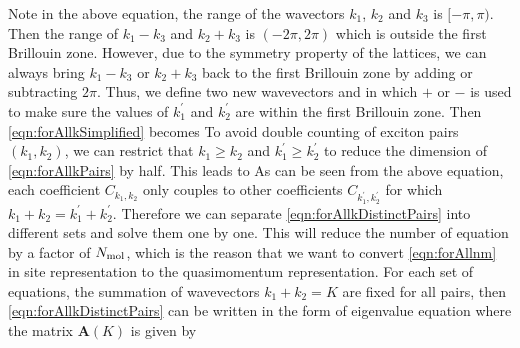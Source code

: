 Note in the above equation, the range of the wavectors $k_1$, $k_2$ and $k_3$ is $[-\pi, \pi)$. Then the range of 
$k_1 - k_3$ and $k_2 + k_3$ is $(-2\pi, 2\pi)$ which is outside the first Brillouin zone. However, due to the symmetry
 property of the lattices, we can always bring $k_1 - k_3$ or $k_2 + k_3$ back to the first Brillouin zone by adding or 
subtracting $2\pi$. Thus, we define two new wavevectors
and 
in which $+$ or $-$ is used to make sure the values of $k_1^{'}$ and $k_2^{'}$ are within the first Brillouin zone. Then 
\autoref{eqn:forAllkSimplified} becomes
To avoid double counting of exciton pairs $(k_1, k_2)$, we can restrict that $k_1 \ge k_2$ and $k_1^{'} \ge k_2^{'}$ to
 reduce the dimension of \autoref{eqn:forAllkPairs} by half. This leads to 
As can be seen from the above equation, each coefficient $C_{k_1, k_2}$ only couples to other coefficients $C_{k_1^{'},
 k_2^{'}}$ for which $k_1 + k_2 = k_1^{'} + k_2^{'} $. Therefore we can separate \autoref{eqn:forAllkDistinctPairs} into 
different sets and solve them one by one. This will reduce the number of equation by a factor of $N_{\rm mol}$, which
 is the reason that we want to convert \autoref{eqn:forAllnm} in site representation to the quasimomentum
 representation. For each set of equations, the summation of wavevectors $k_1 + k_2 =  K$ are fixed for all pairs,
 then \autoref{eqn:forAllkDistinctPairs} can be written in the form of eigenvalue equation 
where the matrix $\mathbf{A}(K)$ is given by
